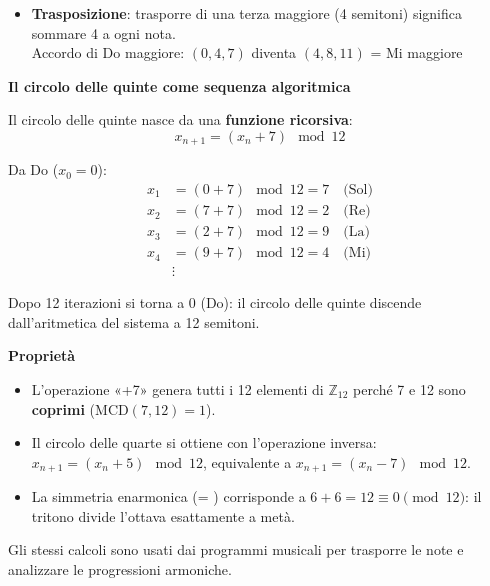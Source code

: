\begin{matematica}
\begin{itemize}
		\item \textbf{Trasposizione}: trasporre di una terza maggiore (4 semitoni) significa sommare 4 a ogni nota.\\
		Accordo di Do maggiore: $(0, 4, 7)$ diventa $(4, 8, 11)$ = Mi maggiore
	\end{itemize}

	\textbf{Il circolo delle quinte come sequenza algoritmica}

	Il circolo delle quinte nasce da una \textbf{funzione ricorsiva}:
	\[
	x_{n+1} = (x_n + 7) \mod 12
	\]

	Da Do ($x_0 = 0$):
	\begin{align*}
	x_1 &= (0 + 7) \mod 12 = 7 \quad \text{(Sol)} \\
	x_2 &= (7 + 7) \mod 12 = 2 \quad \text{(Re)} \\
	x_3 &= (2 + 7) \mod 12 = 9 \quad \text{(La)} \\
	x_4 &= (9 + 7) \mod 12 = 4 \quad \text{(Mi)} \\
	&\vdots
	\end{align*}

	Dopo 12 iterazioni si torna a 0 (Do): il circolo delle quinte discende dall'aritmetica del sistema a 12 semitoni.

	\textbf{Proprietà}

	\begin{itemize}
		\item L'operazione «+7» genera tutti i 12 elementi di $\mathbb{Z}_{12}$ perché 7 e 12 sono \textbf{coprimi} ($\text{MCD}(7, 12) = 1$).
		\item Il circolo delle quarte si ottiene con l'operazione inversa: $x_{n+1} = (x_n + 5) \mod 12$, equivalente a $x_{n+1} = (x_n - 7) \mod 12$.
		\item La simmetria enarmonica (\Fadiesis  = \Solbemolle ) corrisponde a $6 + 6 = 12 \equiv 0 \pmod{12}$: il tritono divide l'ottava esattamente a metà.
	\end{itemize}

	Gli stessi calcoli sono usati dai programmi musicali per trasporre le note e analizzare le progressioni armoniche.
\end{matematica}

